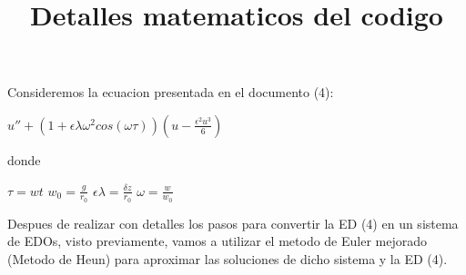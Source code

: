 \documentclass{article}
\title{Detalles matematicos del codigo}
\begin{document}
Consideremos la ecuacion presentada en el documento (4): 
\begin{center}
    $u''+(1+\epsilon \lambda \omega^2 cos(\omega \tau))(u - \frac{\epsilon^2 u^3}{6})$
\end{center}
donde
\begin{center}
    $\tau = wt$
    $w_0 = \frac{g}{r_0}$
    $\epsilon \lambda = \frac{\delta z}{r_0}$
    $\omega = \frac{w}{w_0}$
\end{center}
Despues de realizar con detalles los pasos para convertir la ED (4) en un sistema de EDOs, visto previamente, vamos
a utilizar el metodo de Euler mejorado (Metodo de Heun) para aproximar las soluciones de dicho sistema y la ED (4).
\end{document}
